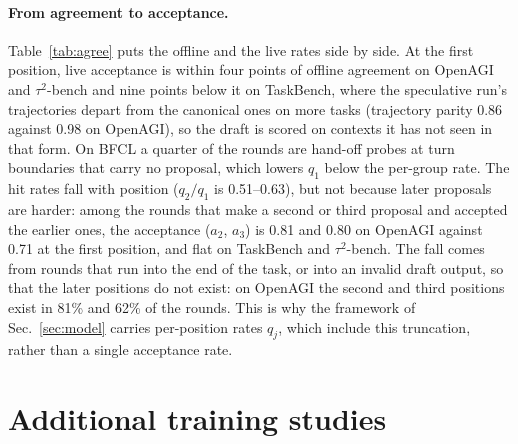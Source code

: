 \paragraph{From agreement to acceptance.}
Table~\ref{tab:agree} puts the offline and the live rates side by side. At the first position, live
acceptance is within four points of offline agreement on OpenAGI and $\tau^2$-bench and nine points below it on
TaskBench, where the speculative run's trajectories depart from the canonical ones on more tasks
(trajectory parity 0.86 against 0.98 on OpenAGI), so the draft is scored on contexts it has not seen in
that form. On BFCL a quarter of the rounds are hand-off probes at turn boundaries that carry no proposal,
which lowers $q_1$ below the per-group rate. The hit rates fall with position ($q_2/q_1$ is 0.51--0.63),
but not because later proposals are harder: among the rounds that make a second or third proposal and
accepted the earlier ones, the acceptance ($a_2$, $a_3$) is 0.81 and 0.80 on OpenAGI against 0.71 at the
first position, and flat on TaskBench and $\tau^2$-bench. The fall comes from rounds that run into the end of
the task, or into an invalid draft output, so that the later positions do not exist: on OpenAGI the
second and third positions exist in 81\% and 62\% of the rounds. This is why the framework of
Sec.~\ref{sec:model} carries per-position rates $q_j$, which include this truncation, rather than a
single acceptance rate.




\section{Additional training studies}
\label{app:training}

